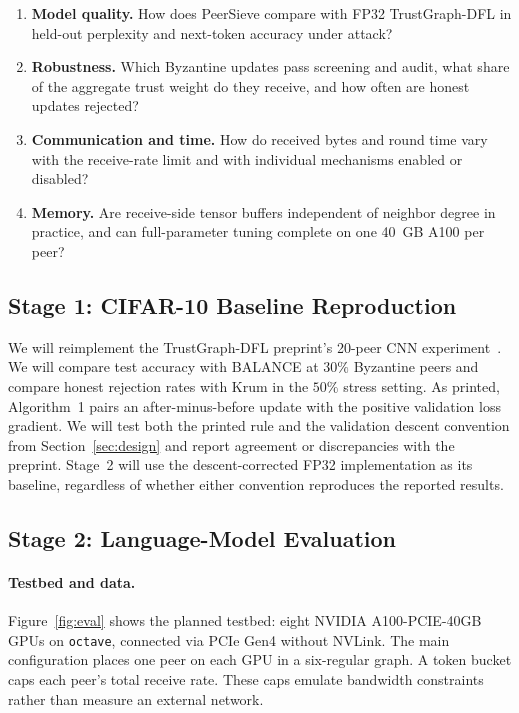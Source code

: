 \documentclass{article}
\begin{document}
\begin{enumerate}[label=\textbf{RQ\arabic*.}]
  \item \textbf{Model quality.} How does PeerSieve compare with FP32 TrustGraph-DFL in held-out perplexity and next-token accuracy under attack?
  \item \textbf{Robustness.} Which Byzantine updates pass screening and audit, what share of the aggregate trust weight do they receive, and how often are honest updates rejected?
  \item \textbf{Communication and time.} How do received bytes and round time vary with the receive-rate limit and with individual mechanisms enabled or disabled?
  \item \textbf{Memory.} Are receive-side tensor buffers independent of neighbor degree in practice, and can full-parameter tuning complete on one 40~GB A100 per peer?
\end{enumerate}

\subsection{Stage 1: CIFAR-10 Baseline Reproduction}

We will reimplement the TrustGraph-DFL preprint's 20-peer CNN experiment~\cite{trustgraph2026}. We will compare test accuracy with BALANCE at $30\%$ Byzantine peers and compare honest rejection rates with Krum in the $50\%$ stress setting. As printed, Algorithm~1 pairs an after-minus-before update with the positive validation loss gradient. We will test both the printed rule and the validation descent convention from Section~\ref{sec:design} and report agreement or discrepancies with the preprint. Stage~2 will use the descent-corrected FP32 implementation as its baseline, regardless of whether either convention reproduces the reported results.

\subsection{Stage 2: Language-Model Evaluation}

\paragraph{Testbed and data.} Figure~\ref{fig:eval} shows the planned testbed: eight NVIDIA A100-PCIE-40GB GPUs on \texttt{octave}, connected via PCIe Gen4 without NVLink. The main configuration places one peer on each GPU in a six-regular graph. A token bucket caps each peer's total receive rate. These caps emulate bandwidth constraints rather than measure an external network.
\end{document}
